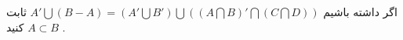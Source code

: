 اگر داشته باشیم
$A' \bigcup (B-A) = (A' \bigcup B') \bigcup ((A\bigcap B)' \bigcap (C\bigcap D))$
ثابت کنید
$A \subset B$ .